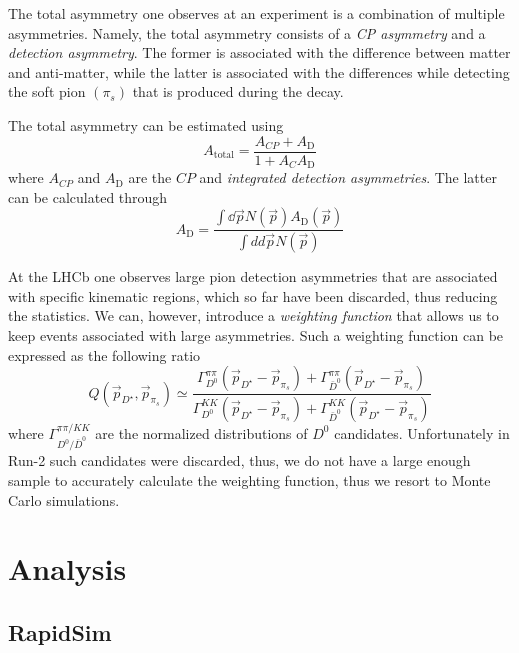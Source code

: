 \documentclass{article}
\begin{document}
        The total asymmetry one observes at an experiment is a combination of multiple asymmetries.
        Namely, the total asymmetry consists of a \textit{CP asymmetry} and a \textit{detection asymmetry}.
        The former is associated with the difference between matter and anti-matter, while the latter is associated with the differences while detecting the soft pion $(\pi_s)$ that is produced during the decay.

        The total asymmetry can be estimated using 
        \begin{equation}
                \label{eq:total}
                A_\text{total} = \frac{A_{CP} + A_\text{D}}{1 + A_{C}A_\text{D}}
        \end{equation}
        where $A_{CP}$ and $A_\text{D}$ are the $CP$ and \textit{integrated detection asymmetries}.
        The latter can be calculated through
        \begin{equation}
                A_\text{D} = \frac{\int \dd \vec{p} N(\vec{p})A_\text{D}(\vec{p})}{\int dd \vec{p} N(\vec{p})}
        \end{equation}

        At the LHCb one observes large pion detection asymmetries that are associated with specific kinematic regions, which so far have been discarded, thus reducing the statistics.
        We can, however, introduce a \textit{weighting function} that allows us to keep events associated with large asymmetries.
        Such a weighting function can be expressed as the following ratio
        \begin{equation}
                \label{eq:weighting}
                Q(\vec{p}_{D^\star}, \vec{p}_{\pi_s}) \simeq \frac{\Gamma_{D^0}^{\pi\pi}(\vec{p}_{D^\star} - \vec{p}_{\pi_s}) + \Gamma_{\bar{D}^0}^{\pi\pi}(\vec{p}_{D^\star} - \vec{p}_{\pi_s})}{\Gamma_{D^0}^{KK}(\vec{p}_{D^\star} - \vec{p}_{\pi_s}) + \Gamma_{\bar{D}^0}^{KK}(\vec{p}_{D^\star} - \vec{p}_{\pi_s})}
        \end{equation}
        where $\Gamma_{D^{0}/\bar{D}^0}^{\pi\pi/KK}$ are the normalized distributions of $D^0$ candidates.
        Unfortunately in Run-2 such candidates were discarded, thus, we do not have a large enough sample to accurately calculate the weighting function, thus we resort to Monte Carlo simulations.

        
        \section{Analysis}
        \subsection{RapidSim}

        \pagebreak
        \nocite{*}
        \printbibliography[notcategory=cited]
\end{document}
